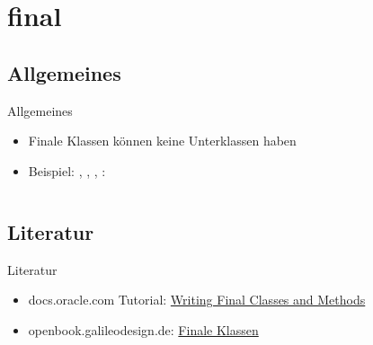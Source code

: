 \documentclass[usepdftitle=false,hyperref={pdfpagelabels=false}]{beamer}
\begin{document}
\section{final}
\subsection{Allgemeines}
\begin{frame}{Allgemeines}
    \begin{itemize}
        \item Finale Klassen können keine Unterklassen haben
        \item Beispiel: , , , :
        \inputminted[linenos=true, numbersep=5pt, tabsize=4, fontsize=\tiny, firstnumber=1, firstline=1, lastline=6]{java}{singleLines.java}
    \end{itemize}
\end{frame}

\subsection{Literatur}
\begin{frame}{Literatur}
    \begin{itemize}
        \item docs.oracle.com Tutorial: \href{http://docs.oracle.com/javase/tutorial/java/IandI/final.html}{Writing Final Classes and Methods}
        \item openbook.galileodesign.de: \href{http://openbook.galileodesign.de/javainsel5/javainsel06_006.htm\#Rxx747java06006040001E71F019239}{Finale Klassen}
    \end{itemize}
\end{frame}

\end{document}
